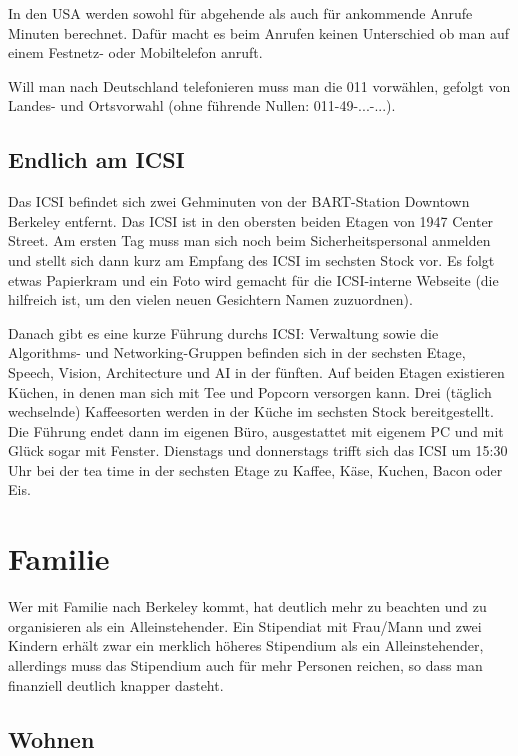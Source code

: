 \documentclass[a4paper]{scrreprt}
\begin{document}
In den USA werden sowohl für abgehende als auch für ankommende Anrufe Minuten berechnet. Dafür macht es beim Anrufen keinen Unterschied ob man auf einem Festnetz- oder Mobiltelefon anruft.

Will man nach Deutschland telefonieren muss man die 011 vorwählen, gefolgt von Landes- und Ortsvorwahl (ohne führende Nullen: 011-49-...-...).

\section{Endlich am ICSI}

Das ICSI befindet sich zwei Gehminuten von der BART-Station Downtown Berkeley entfernt. Das ICSI ist in den obersten beiden Etagen von 1947 Center Street. Am ersten Tag muss man sich noch beim Sicherheitspersonal anmelden und stellt sich dann kurz am Empfang des ICSI im sechsten Stock vor. Es folgt etwas Papierkram und ein Foto wird gemacht für die ICSI-interne Webseite (die hilfreich ist, um den vielen neuen Gesichtern Namen zuzuordnen).

Danach gibt es eine kurze Führung durchs ICSI: Verwaltung sowie die Algorithms- und Networking-Gruppen befinden sich in der sechsten Etage, Speech, Vision, Architecture und AI in der fünften. Auf beiden Etagen existieren Küchen, in denen man sich mit Tee und Popcorn versorgen kann. Drei (täglich wechselnde) Kaffeesorten werden in der Küche im sechsten Stock bereitgestellt. Die Führung endet dann im eigenen Büro, ausgestattet mit eigenem PC und mit Glück sogar mit Fenster. Dienstags und donnerstags trifft sich das ICSI um 15:30 Uhr bei der tea time in der sechsten Etage zu Kaffee, Käse, Kuchen, Bacon oder Eis.

\chapter{Familie}

Wer mit Familie nach Berkeley kommt, hat deutlich mehr zu beachten und zu organisieren als ein Alleinstehender. Ein Stipendiat mit Frau/Mann und zwei Kindern erhält zwar ein merklich höheres Stipendium als ein Alleinstehender, allerdings muss das Stipendium auch für mehr Personen reichen, so dass man finanziell deutlich knapper dasteht.


\section{Wohnen}
\end{document}
